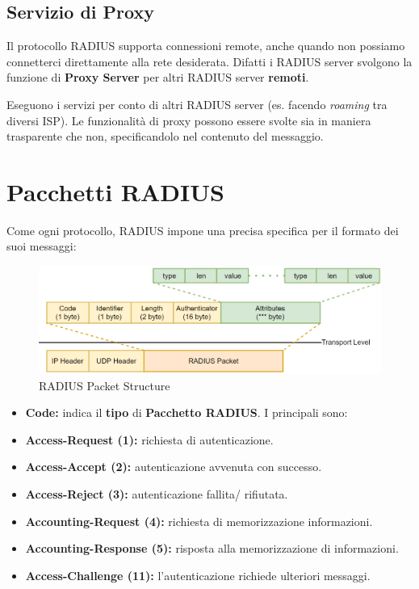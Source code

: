 \subsection{Servizio di Proxy}
Il protocollo RADIUS supporta connessioni remote, anche quando non possiamo connetterci direttamente alla rete desiderata. Difatti i RADIUS server svolgono la funzione di \textbf{Proxy Server} per altri RADIUS server \textbf{remoti}.
\begin{theorem}
 Eseguono i servizi per conto di altri RADIUS server (es. facendo \textit{roaming} tra diversi ISP). Le funzionalità di proxy possono essere svolte sia in maniera trasparente che non, specificandolo nel contenuto del messaggio.
\end{theorem}
\section{Pacchetti RADIUS}
Come ogni protocollo, RADIUS impone una precisa specifica per il formato dei suoi messaggi:
\begin{figure}[h]
    \centering
    \includegraphics[width=\linewidth]{image/radpack.png}
    \caption{RADIUS Packet Structure}
    \label{fig:radpack}
\end{figure}
\begin{itemize}
    \item \textbf{Code:} indica il \textbf{tipo} di \textbf{Pacchetto RADIUS}. I principali sono:
\end{itemize}
        \begin{definition}
        \begin{itemize}
            \item \textbf{Access-Request (1):} richiesta di autenticazione.
            \item \textbf{Access-Accept (2):} autenticazione avvenuta con successo.
            \item \textbf{Access-Reject (3):} autenticazione fallita/ rifiutata.
            \item \textbf{Accounting-Request (4):} richiesta di memorizzazione informazioni.
            \item \textbf{Accounting-Response (5):} risposta alla memorizzazione di informazioni.
            \item \textbf{Access-Challenge (11):} l'autenticazione richiede ulteriori messaggi.
        \end{itemize}
        \end{definition}
